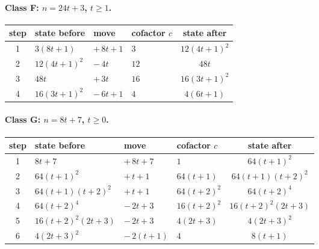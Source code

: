 \paragraph{Class F: $n=24 t + 3$, $t\ge 1$.}
\begin{center}\small\begin{tabular}{@{}clllc@{}}\toprule
step & state before & move & cofactor $c$ & state after\\\midrule
1 & $3 \left(8 t + 1\right)$ & $+\,8 t + 1$ & $3$ & $12 \left(4 t + 1\right)^{2}$ \\
2 & $12 \left(4 t + 1\right)^{2}$ & $-\,4 t$ & $12$ & $48 t$ \\
3 & $48 t$ & $+\,3 t$ & $16$ & $16 \left(3 t + 1\right)^{2}$ \\
4 & $16 \left(3 t + 1\right)^{2}$ & $-\,6 t + 1$ & $4$ & $4 \left(6 t + 1\right)$ \\
\bottomrule\end{tabular}\end{center}
\paragraph{Class G: $n=8 t + 7$, $t\ge 0$.}
\begin{center}\small\begin{tabular}{@{}clllc@{}}\toprule
step & state before & move & cofactor $c$ & state after\\\midrule
1 & $8 t + 7$ & $+\,8 t + 7$ & $1$ & $64 \left(t + 1\right)^{2}$ \\
2 & $64 \left(t + 1\right)^{2}$ & $+\,t + 1$ & $64 \left(t + 1\right)$ & $64 \left(t + 1\right) \left(t + 2\right)^{2}$ \\
3 & $64 \left(t + 1\right) \left(t + 2\right)^{2}$ & $+\,t + 1$ & $64 \left(t + 2\right)^{2}$ & $64 \left(t + 2\right)^{4}$ \\
4 & $64 \left(t + 2\right)^{4}$ & $-\,2 t + 3$ & $16 \left(t + 2\right)^{2}$ & $16 \left(t + 2\right)^{2} \left(2 t + 3\right)$ \\
5 & $16 \left(t + 2\right)^{2} \left(2 t + 3\right)$ & $-\,2 t + 3$ & $4 \left(2 t + 3\right)$ & $4 \left(2 t + 3\right)^{2}$ \\
6 & $4 \left(2 t + 3\right)^{2}$ & $-\,2 \left(t + 1\right)$ & $4$ & $8 \left(t + 1\right)$ \\
\bottomrule\end{tabular}\end{center}
